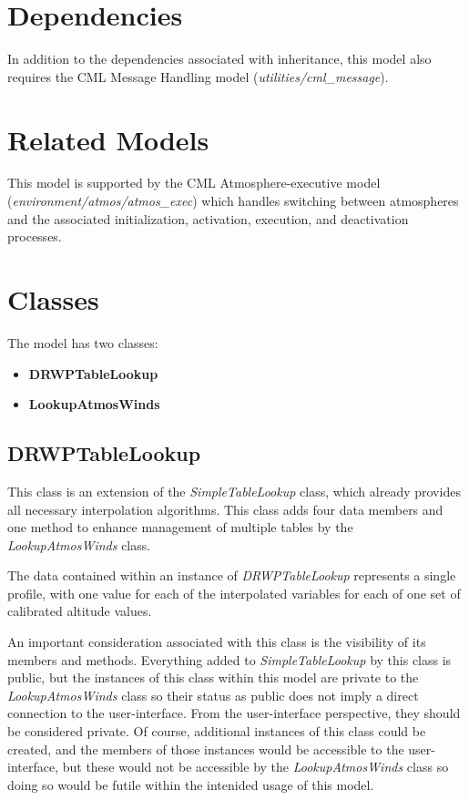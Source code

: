\documentclass[11pt,fleqn]{report}
\begin{document}
\section{Dependencies}
In addition to the dependencies associated with inheritance, this model also
requires the CML Message Handling model (\textit{utilities/cml\_message}).

\section{Related Models} \label{sec:related_models}
This model is supported by the CML Atmosphere-executive model
(\textit{environment/atmos/atmos\_exec}) which handles switching between
atmospheres and the associated initialization, activation, execution, and
deactivation processes.

\section{Classes}
The model has two classes:
\begin{itemize}
\item \textbf{DRWPTableLookup}
\item \textbf{LookupAtmosWinds}
\end{itemize}

\subsection{DRWPTableLookup}
This class is an extension of the \textit{SimpleTableLookup} class, which
already provides all necessary interpolation algorithms. This class adds
four data members and one method to enhance management of multiple tables by
the \textit{LookupAtmosWinds} class.

The data contained within an instance of \textit{DRWPTableLookup} represents
a single profile, with one value for each of the interpolated variables for
each of one set of calibrated altitude values.

An important consideration associated with this class is the visibility of
its members and methods. Everything added to \textit{SimpleTableLookup}
by this class is public, but the
instances of this class within this model are private to the
\textit{LookupAtmosWinds} class so their status as public does not
imply a direct connection to the user-interface.
From the user-interface perspective, they should be considered private.
Of course, additional instances of this class could be created, and the
members of those instances would be accessible to the user-interface, but
these would not be accessible by the \textit{LookupAtmosWinds} class so
doing so would be futile within the intenided usage of this model.
\end{document}
